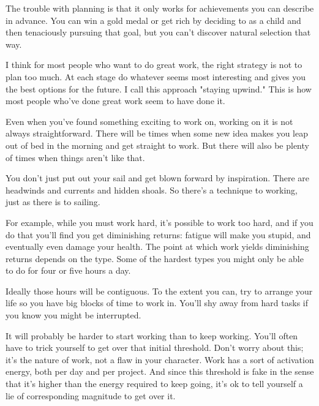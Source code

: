 The
                  trouble with planning is that it only works for achievements
                  you can describe in advance. You can win a gold medal or get
                  rich by deciding to as a child and then tenaciously pursuing
                  that goal, but you can't discover natural selection that
                  way.

I think for most people who want to do great
                  work, the right strategy is not to plan too much. At each
                  stage do whatever seems most interesting and gives you the
                  best options for the future. I call this approach "staying
                  upwind." This is how most people who've done great work seem
                  to have done it.






                  Even when you've found something exciting to work on, working
                  on it is not always straightforward. There will be times when
                  some new idea makes you leap out of bed in the morning and get
                  straight to work. But there will also be plenty of times when
                  things aren't like that.

You don't just put out
                  your sail and get blown forward by inspiration. There are
                  headwinds and currents and hidden shoals. So there's a
                  technique to working, just as there is to sailing.

For
                  example, while you must work hard, it's possible to work too
                  hard, and if you do that you'll find you get diminishing
                  returns: fatigue will make you stupid, and eventually even
                  damage your health. The point at which work yields diminishing
                  returns depends on the type. Some of the hardest types you
                  might only be able to do for four or five hours a day.

Ideally
                  those hours will be contiguous. To the extent you can, try to
                  arrange your life so you have big blocks of time to work in.
                  You'll shy away from hard tasks if you know you might be
                  interrupted.

It will probably be harder to start
                  working than to keep working. You'll often have to trick
                  yourself to get over that initial threshold. Don't worry about
                  this; it's the nature of work, not a flaw in your character.
                  Work has a sort of activation energy, both per day and per
                  project. And since this threshold is fake in the sense that
                  it's higher than the energy required to keep going, it's ok to
                  tell yourself a lie of corresponding magnitude to get over
                  it.

